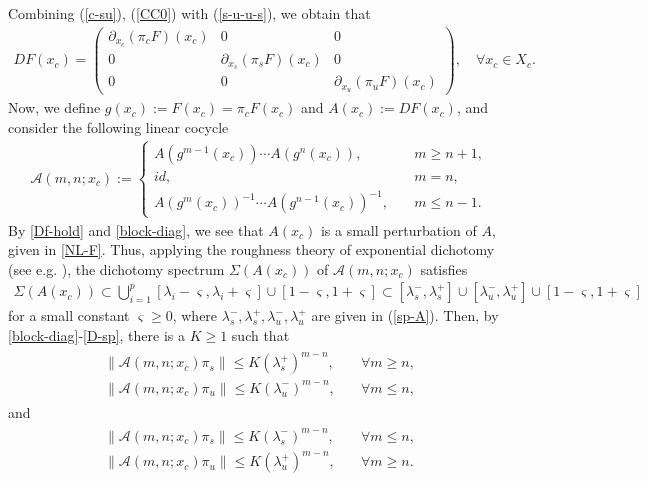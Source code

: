\documentclass[reqno]{amsart}
\numberwithin{equation}{section}
\begin{document}
Combining (\ref{c-su}), (\ref{CC0}) with (\ref{s-u-u-s}), we obtain that
\begin{align}\label{block-diag}
DF(x_c)=\left(
\begin{array}{ccc}
\partial_{x_c}(\pi_cF)(x_c)& 0&
0
\\
0& \partial_{x_s}(\pi_sF)(x_c)&
0
\\
0& 0&
\partial_{x_u}(\pi_uF)(x_c)
\end{array}
\right),
\quad \forall x_c\in X_c.
\end{align}
Now, we define $g(x_c):=F(x_c)=\pi_c F(x_c)$ and $A(x_c):=DF(x_c)$, 
and  consider the following linear cocycle  
\begin{align}\label{group}
\mathcal{A}(m,n;x_c):=
\begin{cases}
 A(g^{m-1}(x_c)) \cdots A(g^{n}(x_c)), \quad & m\ge n+1,
\\
id, \quad & m=n,
\\
A(g^m(x_c))^{-1} \cdots A(g^{n-1}(x_c))^{-1}, \quad & m\le n-1.
\end{cases}
\end{align}
By \eqref{Df-hold} and \eqref{block-diag}, we see that
$A(x_c)$ is a small perturbation of $A$, given in \eqref{NL-F}. Thus, applying
the roughness theory of exponential dichotomy (see e.g. \cite{Henry-Book, ZLZ-JDE}), the dichotomy spectrum $\Sigma(A(x_c))$ of $\mathcal{A}(m,n;x_c)$ satisfies
\begin{align}\label{D-sp}
\Sigma(A(x_c))   \subset  \bigcup_{i=1}^p [\lambda_i-\varsigma,\lambda_i+\varsigma]
\cup [1-\varsigma,1+\varsigma]
  \subset
 [\lambda_s^-, \lambda_s^+  ]
   \cup [\lambda_u^-, \lambda_u^+ ]
   \cup  [1-\varsigma, 1+\varsigma ]
\end{align}
for a small constant $\varsigma\ge 0$, where $\lambda_s^-,\lambda_s^+,\lambda_u^-,\lambda_u^+$ are given in (\ref{sp-A}).
Then, by \eqref{block-diag}-\eqref{D-sp}, there is a $K\ge 1$ such that
\begin{align}\label{ED}
\begin{split}
\|\mathcal{A}(m,n;x_c)\pi_s\| \le K (\lambda_s^+)^{m-n}, \quad & \forall m\ge n,
\\
\|\mathcal{A}(m,n;x_c)\pi_u\| \le K (\lambda_u^-)^{m-n}, \quad & \forall m\le n,
\end{split}
\end{align}
and
\begin{align}\label{S-ED}
\begin{split}
\|\mathcal{A}(m,n;x_c)\pi_s\| \le K (\lambda_s^-)^{m-n}, \quad & \forall m\le n,
\\
\|\mathcal{A}(m,n;x_c)\pi_u\| \le K (\lambda_u^+)^{m-n}, \quad & \forall m\ge n.
\end{split}
\end{align}
\end{document}

